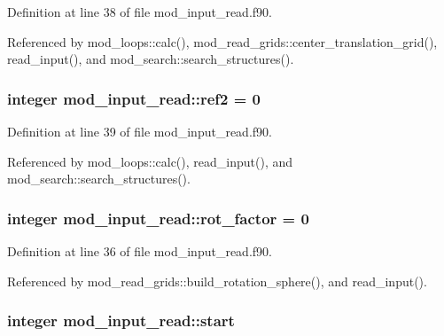 Definition at line 38 of file mod\+\_\+input\+\_\+read.\+f90.



Referenced by mod\+\_\+loops\+::calc(), mod\+\_\+read\+\_\+grids\+::center\+\_\+translation\+\_\+grid(), read\+\_\+input(), and mod\+\_\+search\+::search\+\_\+structures().

\subsubsection[{\texorpdfstring{ref2}{ref2}}]{\setlength{\rightskip}{0pt plus 5cm}integer mod\+\_\+input\+\_\+read\+::ref2 = 0}\hypertarget{namespacemod__input__read_afe9324d2c3dd5b8f8d1afb900599f1e3}{}\label{namespacemod__input__read_afe9324d2c3dd5b8f8d1afb900599f1e3}


Definition at line 39 of file mod\+\_\+input\+\_\+read.\+f90.



Referenced by mod\+\_\+loops\+::calc(), read\+\_\+input(), and mod\+\_\+search\+::search\+\_\+structures().

\subsubsection[{\texorpdfstring{rot\+\_\+factor}{rot_factor}}]{\setlength{\rightskip}{0pt plus 5cm}integer mod\+\_\+input\+\_\+read\+::rot\+\_\+factor = 0}\hypertarget{namespacemod__input__read_a6fde65123947b8b3eaf114c2d96caaad}{}\label{namespacemod__input__read_a6fde65123947b8b3eaf114c2d96caaad}


Definition at line 36 of file mod\+\_\+input\+\_\+read.\+f90.



Referenced by mod\+\_\+read\+\_\+grids\+::build\+\_\+rotation\+\_\+sphere(), and read\+\_\+input().

\subsubsection[{\texorpdfstring{start}{start}}]{\setlength{\rightskip}{0pt plus 5cm}integer mod\+\_\+input\+\_\+read\+::start}\hypertarget{namespacemod__input__read_a1fe425b57ec0b776789d69284fa29955}{}\label{namespacemod__input__read_a1fe425b57ec0b776789d69284fa29955}


